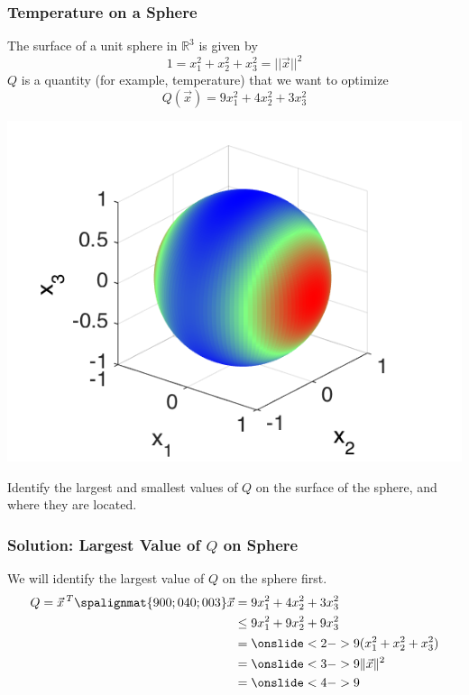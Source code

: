 \begin{frame}\frametitle{Temperature on a Sphere}

    \begin{minipage}{.58\textwidth}
        The surface of a unit sphere in $\mathbb R^3$ is given by $$ 1 = x_1^2 + x_2^2 + x_3^2 = ||\vec x||^2$$ 
        \pause $Q$ is a quantity (for example, temperature) that we want to optimize $$Q(\vec x) = 9x_1^2 + 4x_2^2 +3x_3^2$$ 
    \end{minipage} \begin{minipage}{.41\textwidth}
    \begin{center}
        \includegraphics[width=1\textwidth]{Chapter7/images/sphere73.png} 
    \end{center}
    \end{minipage} 
    
    \vspace{12pt} 
    \pause 
    Identify the largest and smallest values of $Q$ on the surface of the sphere, and where they are located. 
    
\end{frame}


\begin{frame}\frametitle{Solution: Largest Value of $Q$ on Sphere}    
    We will identify the largest value of $Q$ on the sphere first. 
    \begin{align*}
        Q =  \vec x\, ^T \spalignmat{9 0 0;0 4 0;0 0 3}\vec x &= 9x_1^2 + 4x_2^2 +3x_3^2 \\
        &\le 9x_1^2 + 9x_2^2 +9x_3^2 \\
        &= \onslide<2->{ 9 (x_1^2 + x_2^2 +x_3^2)} \\
        &= \onslide<3->{9 \lVert \vec x \rVert ^2} \\
        &= \onslide<4->{ 9  }
    \end{align*}
\end{frame}


